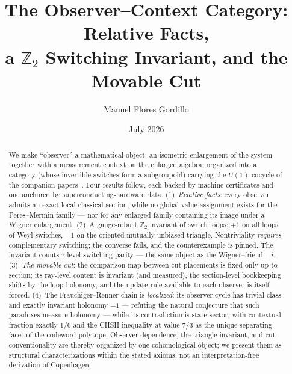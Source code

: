 \documentclass[11pt]{article}
\title{The Observer--Context Category: Relative Facts,\\ a $\mathbb Z_2$ Switching Invariant, and the Movable Cut}
\author{Manuel Flores Gordillo}
\date{July 2026}
\begin{document}
\maketitle
\begin{abstract}
We make ``observer'' a mathematical object: an isometric enlargement of the system
together with a measurement context on the enlarged algebra, organized into a category
(whose invertible switches form a subgroupoid) carrying the $U(1)$ cocycle of the companion papers~\cite{paperA,paperB,paperC}. Four results follow, each backed
by machine certificates and one anchored by superconducting-hardware data.
(1)~\emph{Relative facts}: every observer admits an exact local classical section,
while no global value assignment exists for the Peres--Mermin family --- nor for any
enlarged family containing its image under a Wigner enlargement. (2)~A gauge-robust
$\mathbb Z_2$ invariant of switch loops: $+1$ on all loops of Weyl switches, $-1$ on
the oriented mutually-unbiased triangle. Nontriviality \emph{requires} complementary
switching; the converse fails, and the counterexample is pinned. The invariant counts
$\tau$-level switching parity --- the same object as the Wigner--friend $-i$.
(3)~\emph{The movable cut}: the comparison map between cut placements is fixed only up
to section; its ray-level content is invariant (and measured), the section-level
bookkeeping shifts by the loop holonomy, and the update rule available to each observer
is itself forced. (4)~The Frauchiger--Renner chain is \emph{localized}: its observer
cycle has trivial class and exactly invariant holonomy $+1$ --- refuting the natural
conjecture that such paradoxes measure holonomy --- while its contradiction is
state-sector, with contextual fraction exactly $1/6$ and the CHSH inequality at value
$7/3$ as the unique separating facet of the codeword polytope. Observer-dependence, the triangle invariant, and cut conventionality
are thereby organized by one cohomological object; we present them as structural characterizations within the stated axioms, not an interpretation-free derivation of Copenhagen.
\end{abstract}
\end{document}
